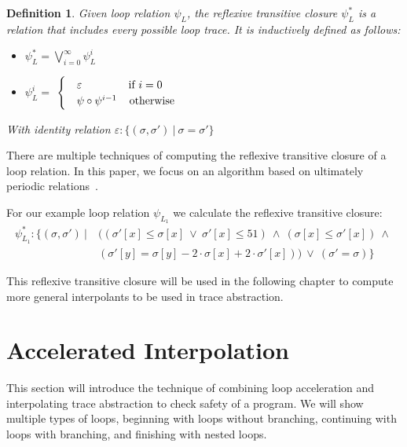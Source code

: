 \documentclass{article}
\newcounter{example}[section]
\newtheorem{mydef}{Definition}
\newcommand\mycom[1]{}
\newcommand\mycom[1]{#1}
\newcommand{\dd}[1]{\mycom{\todo[color=orange!40,inline]{\small DD: #1}}}
\newcommand{\ts}[1]{\mycom{\todo[color=green!40,inline]{\small TS: #1}}}
\begin{document}
\begin{mydef}
    Given loop relation $\psi_L$, the reflexive transitive closure $\psi_L^*$ is a relation that includes every possible loop trace. It is inductively defined as follows:
    \begin{itemize}
        \item $\psi^*_L = \bigvee_{i=0}^\infty \psi^i_L$
        \item $\psi^i_L = $
        $\begin{cases}
            & \varepsilon \hspace{1.5cm} \text{if}\ i = 0 \\
            & \psi \circ \psi^{i - 1} \hspace{0.4cm}\text{otherwise}
        \end{cases}$
    \end{itemize}
With identity relation $\varepsilon: \{(\sigma, \sigma')\ |\ \sigma = \sigma'\}$
\end{mydef}
\ts{In the definition, only define reflexive transitive closure, and \emph{afterwards} write what it means here (...every possible loop trace...).}
\dd{You missed some $L$s}
There are multiple techniques of computing the reflexive transitive closure of a loop relation. 
In this paper, we focus on an algorithm based on ultimately periodic relations~\cite{JillThesis}.

For our example loop relation $\psi_{L_1}$ we calculate the reflexive transitive closure:
\begin{align*}
    \psi^*_{L_1}: \{(\sigma, \sigma') \  |\ &((\sigma'[x] \leq \sigma[x]\ \lor\ \sigma'[x] \leq 51)\ \land\ (\sigma[x] \leq \sigma'[x])\ \land\ \\ & (\sigma'[y] = \sigma[y] - 2 \cdot \sigma[x] + 2\cdot \sigma'[x]))\ \lor\ (\sigma' = \sigma) \}
\end{align*}
\newcommand{\rtc}[1]{\ensuremath{\psi^*_{#1}}}
\dd{Are you really sure this is the correct $\rtc{L_1}$?}
This reflexive transitive closure will be used in the following chapter to compute more general interpolants to be used in trace abstraction.

\section{Accelerated Interpolation}\label{sec:accelinterpol}
This section will introduce the technique of combining loop acceleration and interpolating trace abstraction to check safety of a program. 
We will show multiple types of loops, beginning with loops without branching, continuing with loops with branching, and finishing with nested loops.
\end{document}
